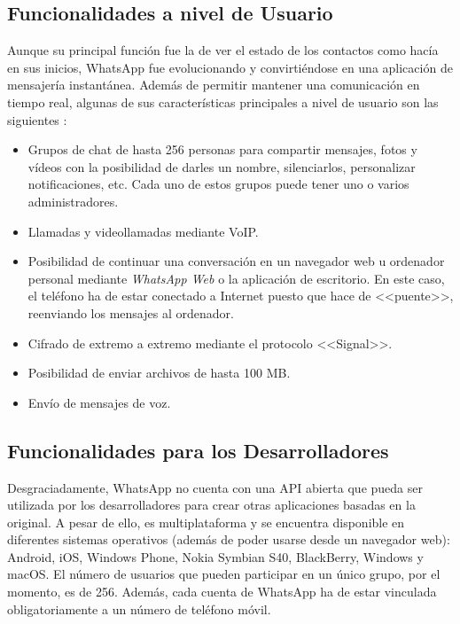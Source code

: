 \subsection{Funcionalidades a nivel de Usuario}
Aunque su principal función fue la de ver el estado de los contactos como hacía en sus inicios, WhatsApp fue evolucionando y convirtiéndose en una aplicación de mensajería instantánea. Además de permitir mantener una comunicación en tiempo real, algunas de sus características principales a nivel de usuario son las siguientes \cite{WhatsApp2017}:

\begin{itemize}
	\item Grupos de chat de hasta 256 personas para compartir mensajes, fotos y vídeos con la posibilidad de darles un nombre, silenciarlos, personalizar notificaciones, etc. Cada uno de estos grupos puede tener uno o varios administradores.
	\item Llamadas y videollamadas mediante \acf{VoIP}.
	\item Posibilidad de continuar una conversación en un navegador web u ordenador personal mediante \textit{WhatsApp Web} o la aplicación de escritorio. En este caso, el teléfono ha de estar conectado a Internet puesto que hace de <<puente>>, reenviando los mensajes al ordenador.
	\item Cifrado de extremo a extremo mediante el protocolo <<Signal>>.
	\item Posibilidad de enviar archivos de hasta 100 \acs{MB}.
	\item Envío de mensajes de voz.
\end{itemize}


\subsection{Funcionalidades para los Desarrolladores}
Desgraciadamente, WhatsApp no cuenta con una \acs{API} abierta que pueda ser utilizada por los desarrolladores para crear otras aplicaciones basadas en la original. A pesar de ello, es multiplataforma y se encuentra disponible en diferentes sistemas operativos (además de poder usarse desde un navegador web): Android, iOS, Windows Phone, Nokia Symbian S40, BlackBerry, Windows y macOS. El número de usuarios que pueden participar en un único grupo, por el momento, es de 256. Además, cada cuenta de WhatsApp ha de estar vinculada obligatoriamente a un número de teléfono móvil.

